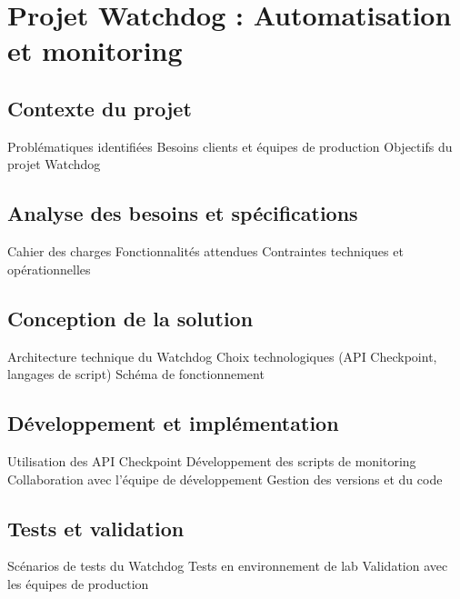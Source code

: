\section{Projet Watchdog : Automatisation et monitoring}

\subsection{Contexte du projet}
Problématiques identifiées
Besoins clients et équipes de production
Objectifs du projet Watchdog


\subsection{Analyse des besoins et spécifications}
Cahier des charges
Fonctionnalités attendues
Contraintes techniques et opérationnelles


\subsection{Conception de la solution}
Architecture technique du Watchdog
Choix technologiques (API Checkpoint, langages de script)
Schéma de fonctionnement

\subsection{Développement et implémentation}
Utilisation des API Checkpoint
Développement des scripts de monitoring
Collaboration avec l'équipe de développement
Gestion des versions et du code

\subsection{Tests et validation}
Scénarios de tests du Watchdog
Tests en environnement de lab
Validation avec les équipes de production